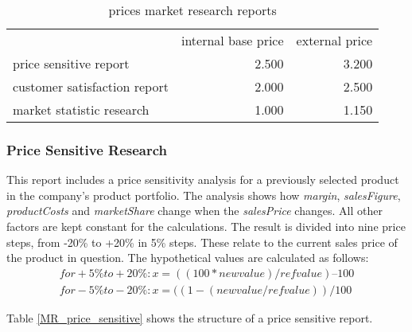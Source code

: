 \begin{table}[ht]
\centering
\begin{tabular}{|l|r|r|}
\hline
                             & internal base price  & external price \\
price sensitive report       & 2.500                & 3.200     \\
customer satisfaction report & 2.000                & 2.500     \\
market statistic research    & 1.000                & 1.150     \\
\hline
\end{tabular}
\caption{prices market research reports}
\label{MR_report_price}
\end{table}



\subsubsection{Price Sensitive Research}
This report includes a price sensitivity analysis for a previously selected product in the company's product portfolio. The analysis shows how \textit{margin}, \textit{salesFigure}, \textit{productCosts} and \textit{marketShare} change when the \textit{salesPrice} changes. All other factors are kept constant for the calculations. The result is divided into nine price steps, from -20\% to +20\% in 5\% steps. These relate to the current sales price of the product in question. The hypothetical values are calculated as follows:
\begin{equation}
    \begin{aligned}
        for +5\% to +20\%: x = ((100 * new value) / ref value) – 100 \\
        for -5\% to -20\%: x = ((1 - (new value / ref value)) / 100
    \end{aligned}
\end{equation}

Table \ref{MR_price_sensitive} shows the structure of a price sensitive report. \\

